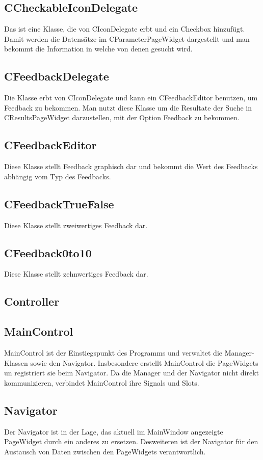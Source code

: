 \subsection*{CCheckableIconDelegate}
Das ist eine Klasse, die von CIconDelegate erbt und ein Checkbox hinzufügt. Damit werden die Datensätze im CParameterPageWidget dargestellt und man bekommt die Information in welche von denen gesucht wird. 

\subsection*{CFeedbackDelegate}
Die Klasse erbt von CIconDelegate und kann ein CFeedbackEditor benutzen, um Feedback zu bekommen. Man nutzt diese Klasse um die Resultate der Suche in CResultsPageWidget darzustellen, mit der Option Feedback zu bekommen. 

\subsection*{CFeedbackEditor}
Diese Klasse stellt Feedback graphisch dar und bekommt die Wert des Feedbacks abhängig vom Typ des Feedbacks.

\subsection*{CFeedbackTrueFalse}

Diese Klasse stellt zweiwertiges Feedback dar.

\subsection*{CFeedback0to10}
Diese Klasse stellt zehnwertiges Feedback dar.


\subsection{Controller}
\subsection*{MainControl}
MainControl ist der Einstiegspunkt des Programms und verwaltet die Manager-Klassen sowie den Navigator. Insbesondere erstellt MainControl die PageWidgets un registriert sie beim Navigator.
Da die Manager und der Navigator nicht direkt kommunizieren, verbindet MainControl ihre Signals und Slots.

\subsection*{Navigator}
Der Navigator ist in der Lage, das aktuell im MainWindow angezeigte PageWidget durch ein anderes zu ersetzen. Desweiteren ist der Navigator für den Austausch von Daten zwischen den PageWidgets verantwortlich.

